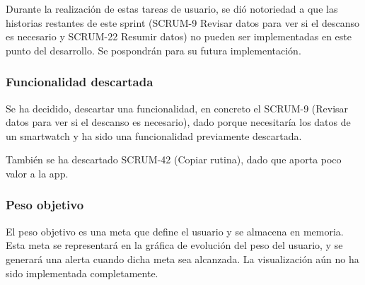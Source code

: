 
Durante la realización de estas tareas de usuario, se dió notoriedad a que las historias restantes de este sprint (SCRUM-9 Revisar datos para ver si el descanso es necesario y SCRUM-22 Resumir datos) no pueden ser implementadas en este punto del desarrollo. Se pospondrán para su futura implementación.

\subsubsection{Funcionalidad descartada}

Se ha decidido, descartar una funcionalidad, en concreto el SCRUM-9 (Revisar datos para ver si el descanso es necesario), dado porque necesitaría los datos de un smartwatch y ha sido una funcionalidad previamente descartada.

También se ha descartado SCRUM-42 (Copiar rutina), dado que aporta poco valor a la app.

\subsubsection{Peso objetivo}
El peso objetivo es una meta que define el usuario y se almacena en memoria. Esta meta se representar\'a en la gr\'afica de evoluci\'on del peso del usuario, y se generar\'a una alerta cuando dicha meta sea alcanzada. La visualizaci\'on a\'un no ha sido implementada completamente.

